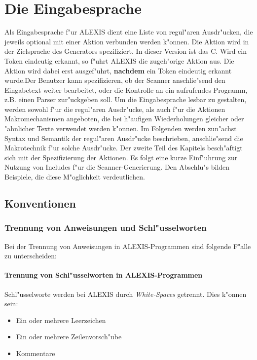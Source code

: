 \chapter{Die Eingabesprache}
Als Eingabesprache f"ur ALEXIS dient eine Liste von regul"aren Ausdr"ucken, die jeweils
optional mit einer Aktion verbunden werden k"onnen. Die Aktion wird in der Zielsprache
des Generators spezifiziert. In dieser Version ist das C. Wird ein Token eindeutig
erkannt, so f"uhrt ALEXIS die zugeh"orige Aktion aus. Die Aktion wird dabei erst
ausgef"uhrt, {\bf nachdem} ein Token eindeutig erkannt wurde.Der Benutzer kann 
spezifizieren, ob der Scanner anschlie"send den Eingabetext weiter bearbeitet, 
oder die Kontrolle an ein aufrufendes Programm, z.B. einen Parser zur"uckgeben 
soll. Um die Eingabesprache lesbar zu gestalten, werden sowohl f"ur die regul"aren
Ausdr"ucke, als auch f"ur die Aktionen Makromechanismen angeboten, die bei h"aufigen
Wiederholungen gleicher oder "ahnlicher Texte verwendet werden k"onnen.\hfill \break 
Im Folgenden werden zun"achst Syntax und Semantik der regul"aren Ausdr"ucke
beschrieben, anschlie"send die Makrotechnik f"ur solche Ausdr"ucke. Der zweite Teil
des Kapitels besch"aftigt sich mit der Spezifizierung der Aktionen. Es folgt eine
kurze Einf"uhrung zur Nutzung von Includes f"ur die Scanner-Generierung. Den Abschlu"s
bilden Beispiele, die diese M"oglichkeit verdeutlichen.

\vfill \eject 
\section{Konventionen}
\subsection{Trennung von Anweisungen und Schl"usselworten}
Bei der Trennung von Anweisungen in ALEXIS-Programmen sind folgende F"alle zu
unterscheiden:
\subsubsection{Trennung von Schl"usselworten in ALEXIS-Programmen}
Schl"usselworte werden bei ALEXIS durch {\it White-Spaces\/} getrennt. Dies k"onnen
sein:

\medskip

\begin{itemize}
\item Ein oder mehrere Leerzeichen
\item Ein oder mehrere Zeilenvorsch"ube
\item Kommentare
\end{itemize}

